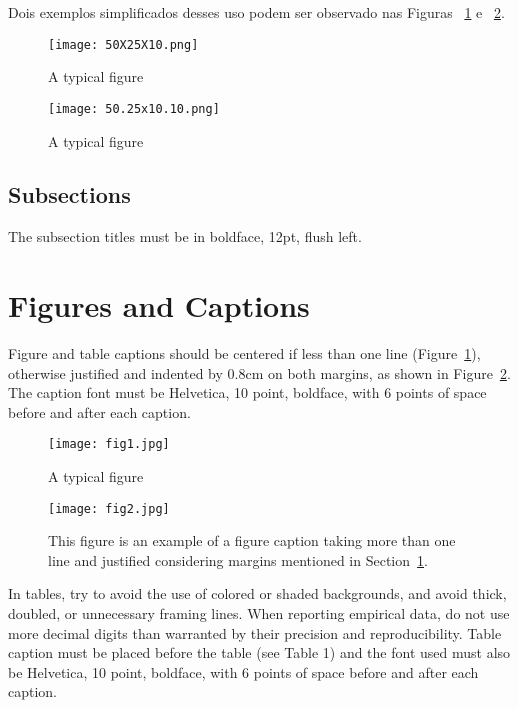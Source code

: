 \documentclass[12pt]{article}
\begin{document}
Dois exemplos simplificados desses uso podem ser observado nas Figuras ~\ref{fig:exampleFig1} e ~\ref{fig:exampleFig2}.

\begin{figure}[ht]
\centering
\texttt{[image: 50X25X10.png]}
\caption{A typical figure}
\label{fig:exampleFig1}
\end{figure}

\begin{figure}[ht]
\centering
\texttt{[image: 50.25x10.10.png]}
\caption{A typical figure}
\label{fig:exampleFig2}
\end{figure}

\subsection{Subsections}

The subsection titles must be in boldface, 12pt, flush left.

\section{Figures and Captions}\label{sec:figs}


Figure and table captions should be centered if less than one line
(Figure~\ref{fig:exampleFig1}), otherwise justified and indented by 0.8cm on
both margins, as shown in Figure~\ref{fig:exampleFig2}. The caption font must
be Helvetica, 10 point, boldface, with 6 points of space before and after each
caption.

\begin{figure}[ht]
\centering
\texttt{[image: fig1.jpg]}
\caption{A typical figure}
\label{fig:exampleFig3}
\end{figure}

\begin{figure}[ht]
\centering
\texttt{[image: fig2.jpg]}
\caption{This figure is an example of a figure caption taking more than one
  line and justified considering margins mentioned in Section~\ref{sec:figs}.}
\label{fig:exampleFig4}
\end{figure}

In tables, try to avoid the use of colored or shaded backgrounds, and avoid
thick, doubled, or unnecessary framing lines. When reporting empirical data,
do not use more decimal digits than warranted by their precision and
reproducibility. Table caption must be placed before the table (see Table 1)
and the font used must also be Helvetica, 10 point, boldface, with 6 points of
space before and after each caption.
\end{document}
